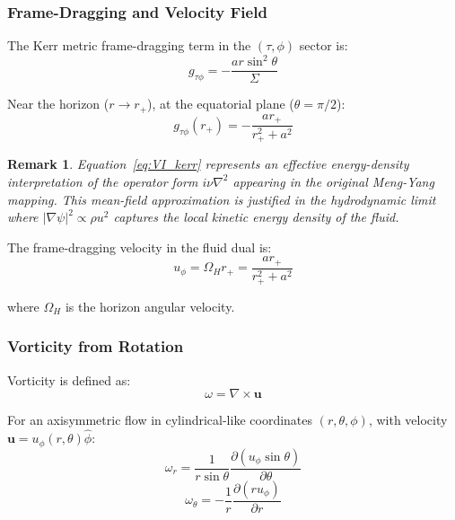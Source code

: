 \documentclass[11pt]{article}
\newtheorem{remark}{Remark}
\begin{document}
\subsubsection{Frame-Dragging and Velocity Field}

The Kerr metric frame-dragging term in the $(\tau, \phi)$ sector is:
\begin{equation}
g_{\tau\phi} = -\frac{a r \sin^2\theta}{\Sigma}
\end{equation}

Near the horizon ($r \to r_+$), at the equatorial plane ($\theta = \pi/2$):
\begin{equation}
g_{\tau\phi}(r_+) = -\frac{a r_+}{r_+^2 + a^2}
\end{equation}

\begin{remark}
Equation~\eqref{eq:VI_kerr} represents an effective energy-density interpretation of the
operator form $i\nu\nabla^2$ appearing in the original Meng-Yang mapping. This mean-field
approximation is justified in the hydrodynamic limit where $|\nabla\psi|^2 \propto \rho u^2$
captures the local kinetic energy density of the fluid.
\end{remark}

The frame-dragging velocity in the fluid dual is:
\begin{equation}
u_\phi = \Omega_H r_+ = \frac{a r_+}{r_+^2 + a^2}
\end{equation}

where $\Omega_H$ is the horizon angular velocity.

\subsubsection{Vorticity from Rotation}

Vorticity is defined as:
\begin{equation}
\omega = \nabla \times \mathbf{u}
\end{equation}

For an axisymmetric flow in cylindrical-like coordinates $(r, \theta, \phi)$, with velocity $\mathbf{u} = u_\phi(r,\theta)\hat{\phi}$:
\begin{equation}
\omega_r = \frac{1}{r\sin\theta}\frac{\partial(u_\phi \sin\theta)}{\partial\theta}
\end{equation}
\begin{equation}
\omega_\theta = -\frac{1}{r}\frac{\partial(r u_\phi)}{\partial r}
\end{equation}
\end{document}
